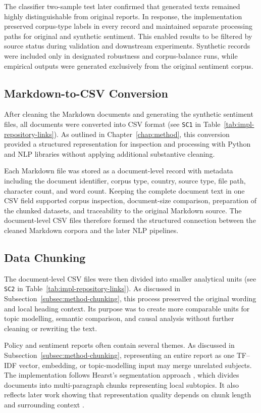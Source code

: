 The classifier two-sample test later confirmed that generated texts remained highly
distinguishable from original reports. In response, the implementation preserved
corpus-type labels in every record and maintained separate processing paths for
original and synthetic sentiment. This enabled results to be filtered by source
status during validation and downstream experiments. Synthetic records were included
only in designated robustness and corpus-balance runs, while empirical outputs were
generated exclusively from the original sentiment corpus.

\subsection{Markdown-to-CSV Conversion}

After cleaning the Markdown documents and generating the synthetic sentiment files,
all documents were converted into CSV format (see \texttt{SC1} in
Table~\ref{tab:impl-repository-links}). As outlined in
Chapter~\ref{chap:method}, this conversion provided a structured representation for
inspection and processing with Python and NLP libraries without applying additional
substantive cleaning.

Each Markdown file was stored as a document-level record with metadata including the
document identifier, corpus type, country, source type, file path, character count,
and word count. Keeping the complete document text in one CSV field supported corpus
inspection, document-size comparison, preparation of the chunked datasets, and
traceability to the original Markdown source. The document-level CSV files therefore
formed the structured connection between the cleaned Markdown corpora and the later
NLP pipelines.

\subsection{Data Chunking}

The document-level CSV files were then divided into smaller analytical units (see
\texttt{SC2} in Table~\ref{tab:impl-repository-links}). As discussed in
Subsection~\ref{subsec:method-chunking}, this process preserved the original wording
and local heading context. Its purpose was to create more comparable units for topic
modelling, semantic comparison, and causal analysis without further cleaning or
rewriting the text.

Policy and sentiment reports often contain several themes. As discussed in
Subsection~\ref{subsec:method-chunking}, representing an entire report as one TF--IDF
vector, embedding, or topic-modelling input may merge unrelated subjects. The
implementation follows Hearst's segmentation approach \cite{hearst1997texttiling},
which divides documents into multi-paragraph chunks representing local subtopics. It
also reflects later work showing that representation quality depends on chunk length
and surrounding context \cite{gunther2024latechunking,duarte2024lumberchunker}.

